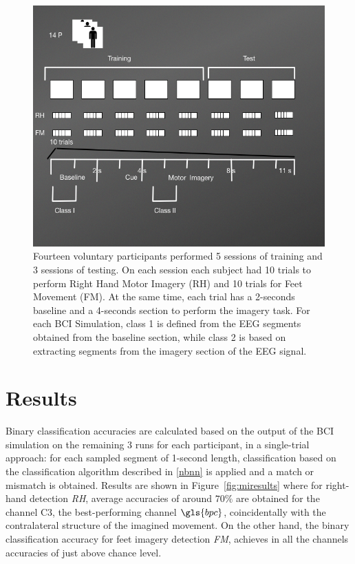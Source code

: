 \begin{figure}[]
\centering
\includegraphics[scale=0.6]{images/DatasetIIIDiagram2.png}
\caption[Motor Imagery Experimental Protocol]{Fourteen voluntary participants performed 5 sessions of training and 3 sessions of testing.  On each session each subject had 10 trials to perform Right Hand Motor Imagery (RH) and 10 trials for Feet Movement (FM).  At the same time, each trial has a 2-seconds baseline and a 4-seconds section to perform the imagery task.  For each BCI Simulation, class 1 is defined from the EEG segments obtained from the baseline section, while class 2 is based on extracting segments from the imagery section of the EEG signal.}
\label{fig:midatasetdiagram}
\end{figure}


\section{Results}

Binary classification accuracies are calculated based on the output of the BCI simulation on the remaining 3 runs for each participant, in a single-trial approach: for each sampled segment of 1-second length, classification based on the classification algorithm described in \ref{nbnn} is applied and a match or mismatch is obtained.  Results are shown in Figure~\ref{fig:miresults} where for right-hand detection \textit{RH}, average accuracies of around $70\%$ are obtained for the channel C3, the best-performing channel $\gls{bpc}$, coincidentally with the contralateral structure of the imagined movement.  On the other hand, the binary classification accuracy for feet imagery detection \textit{FM}, achieves in all the channels accuracies of just above chance level.

